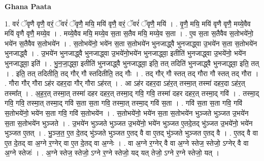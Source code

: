\documentclass[17pt]{extarticle}
\begin{document}
\textbf{Ghana Paata } \newline

1. वरं॑ ॅवृणै वृणै॒ वरं॒ ॅवरं॑ ॅवृणै॒ मयि॒ मयि॑ वृणै॒ वरं॒ ॅवरं॑ ॅवृणै॒ मयि॑ । . वृ॒णै॒ मयि॒ मयि॑ वृणै वृणै॒ मय्ये॒वैव मयि॑ वृणै वृणै॒ मय्ये॒व । . मय्ये॒वैव मयि॒ मय्ये॒व स॒ता स॒तैव मयि॒ मय्ये॒व स॒ता । . ए॒व स॒ता स॒तैवैव स॒तोभये॑नो॒ भये॑न स॒तैवैव स॒तोभये॑न । . स॒तोभये॑नो॒ भये॑न स॒ता स॒तोभये॑न भुनजाद्ध्वै भुनजाद्ध्वा उ॒भये॑न स॒ता स॒तोभये॑न भुनजाद्ध्वै । . उ॒भये॑न भुनजाद्ध्वै भुनजाद्ध्वा उ॒भये॑नो॒भये॑न भुनजाद्ध्वा॒ इतीति॑ भुनजाद्ध्वा उ॒भये॑नो॒ भये॑न भुनजाद्ध्वा॒ इति॑ । . भु॒न॒जा॒द्ध्वा॒ इतीति॑ भुनजाद्ध्वै भुनजाद्ध्वा॒ इति॒ तत् तदिति॑ भुनजाद्ध्वै भुनजाद्ध्वा॒ इति॒ तत् । . इति॒ तत् तदितीति॒ तद् गौर् गौ स्तदितीति॒ तद् गौः । . तद् गौर् गौ स्तत् तद् गौरा गौ स्तत् तद् गौरा । . गौरा गौर् गौरा ऽह॑र दहर॒दा गौर् गौरा ऽह॑रत् । . आ ऽह॑र दहर॒दा ऽह॑र॒त् तस्मा॒त् तस्मा॑ दहर॒दा ऽह॑र॒त् तस्मा᳚त् । . अ॒ह॒र॒त् तस्मा॒त् तस्मा॑ दहर दहर॒त् तस्मा॒द् गवि॒ गवि॒ तस्मा॑ दहर दहर॒त् तस्मा॒द् गवि॑ । . तस्मा॒द् गवि॒ गवि॒ तस्मा॒त् तस्मा॒द् गवि॑ स॒ता स॒ता गवि॒ तस्मा॒त् तस्मा॒द् गवि॑ स॒ता । . गवि॑ स॒ता स॒ता गवि॒ गवि॑ स॒तोभये॑नो॒ भये॑न स॒ता गवि॒ गवि॑ स॒तोभये॑न । . स॒तोभये॑नो॒ भये॑न स॒ता स॒तोभये॑न भुञ्जते भुञ्जत उ॒भये॑न स॒ता स॒तोभये॑न भुञ्जते । . उ॒भये॑न भुञ्जते भुञ्जत उ॒भये॑नो॒ भये॑न भुञ्जत ए॒तदे॒तद् भु॑ञ्जत उ॒भये॑नो॒ भये॑न भुञ्जत ए॒तत् । . भु॒ञ्ज॒त॒ ए॒त दे॒तद् भु॑ञ्जते भुञ्जत ए॒तद् वै वा ए॒तद् भु॑ञ्जते भुञ्जत ए॒तद् वै । . ए॒तद् वै वा ए॒त दे॒तद् वा अ॒ग्ने र॒ग्नेर् वा ए॒त दे॒तद् वा अ॒ग्नेः । . वा अ॒ग्ने र॒ग्नेर् वै वा अ॒ग्ने स्तेज॒ स्तेजो॒ ऽग्नेर् वै वा अ॒ग्ने स्तेजः॑ । . अ॒ग्ने स्तेज॒ स्तेजो॒ ऽग्ने र॒ग्ने स्तेजो॒ यद् यत् तेजो॒ ऽग्ने र॒ग्ने स्तेजो॒ यत् । \newline
\end{document}
